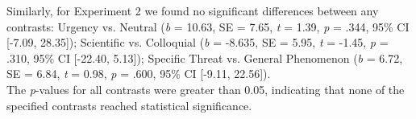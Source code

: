  Similarly, for Experiment 2 we found no significant differences between any contrasts: Urgency vs. Neutral (\textit{b} = 10.63, SE = 7.65, \textit{t }= 1.39, \textit{p} = .344, 95\% CI [-7.09, 28.35]); Scientific vs. Colloquial (\textit{b} = -8.635, SE = 5.95, \textit{t} = -1.45, \textit{p} = .310, 95\% CI [-22.40, 5.13]); Specific Threat vs. General Phenomenon (\textit{b} = 6.72, SE = 6.84, \textit{t} = 0.98, \textit{p} = .600, 95\% CI [-9.11, 22.56]). \\

 The \textit{p}-values for all contrasts were greater than 0.05, indicating that none of the specified contrasts reached statistical significance. 

